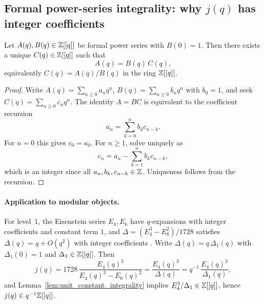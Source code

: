 \subsection{Formal power-series integrality: why \texorpdfstring{$j(q)$}{j(q)} has integer coefficients}
\label{app:j_integrality_formal}

\begin{lemma}
\label{lem:unit_constant_integrality}
Let $A(q),B(q)\in \mathbb{Z}[[q]]$ be formal power series with $B(0)=1$. Then there exists a unique $C(q)\in\mathbb{Z}[[q]]$ such that
\begin{equation}
A(q)=B(q)\,C(q),
\end{equation}
equivalently $C(q)=A(q)/B(q)$ in the ring $\mathbb{Z}[[q]]$.
\end{lemma}

\begin{proof}
Write $A(q)=\sum_{n\ge 0} a_n q^n$, $B(q)=\sum_{n\ge 0} b_n q^n$ with $b_0=1$, and seek $C(q)=\sum_{n\ge 0} c_n q^n$. The identity $A=BC$ is equivalent to the coefficient recursion
\begin{equation}
a_n=\sum_{k=0}^n b_k c_{n-k}.
\end{equation}
For $n=0$ this gives $c_0=a_0$. For $n\ge 1$, solve uniquely as
\begin{equation}
c_n=a_n-\sum_{k=1}^n b_k c_{n-k},
\end{equation}
which is an integer since all $a_n,b_k,c_{n-k}\in\mathbb{Z}$. Uniqueness follows from the recursion.
\end{proof}

\paragraph{Application to modular objects.}
For level~$1$, the Eisenstein series $E_4,E_6$ have $q$-expansions with integer coefficients and constant term $1$, and $\Delta=(E_4^3-E_6^2)/1728$ satisfies $\Delta(q)=q+O(q^2)$ with integer coefficients \cite{Serre1973,Apostol1990}. Write $\Delta(q)=q\,\Delta_1(q)$ with $\Delta_1(0)=1$ and $\Delta_1\in\mathbb{Z}[[q]]$. Then
\begin{equation}
j(q)=1728\,\frac{E_4(q)^3}{E_4(q)^3-E_6(q)^2}
=\frac{E_4(q)^3}{\Delta(q)}
=q^{-1}\,\frac{E_4(q)^3}{\Delta_1(q)},
\end{equation}
and Lemma~\ref{lem:unit_constant_integrality} implies $E_4^3/\Delta_1\in\mathbb{Z}[[q]]$, hence $j(q)\in q^{-1}\mathbb{Z}[[q]]$.


